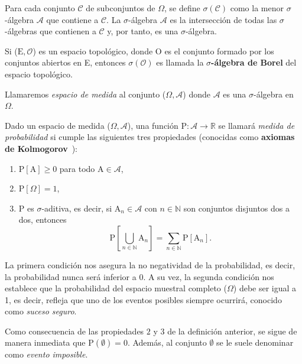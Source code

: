 \begin{definicion}\label{def:sigma-algebra-borel}
    Para cada conjunto $\mathcal{C}$ de subconjuntos de $\Omega$, se define $\sigma(\mathcal{C})$ como la menor $\sigma$-álgebra $\mathcal{A}$ que contiene a $\mathcal{C}$. La $\sigma$-álgebra $\mathcal{A}$ es la intersección de todas las $\sigma$-álgebras que contienen a $\mathcal{C}$ y, por tanto, es una $\sigma$-álgebra.

    Si ($\mathrm{E}, \mathcal{O}$) es un espacio topológico, donde $\mathrm{O}$ es el conjunto formado por los conjuntos abiertos en E, entonces $\sigma(\mathcal{O})$ es llamada la \textbf{$\sigma$-álgebra de Borel} del espacio topológico.
\end{definicion}

Llamaremos \emph{espacio de medida} al conjunto ($\Omega, \mathcal{A}$) donde $\mathcal{A}$ es una $\sigma$-álgebra en $\Omega$.

\begin{definicion}\label{def:medida-de-probabilidad}
    Dado un espacio de medida ($\Omega, \mathcal{A}$), una función $\mathrm{P}: \mathcal{A} \to \mathbb{R}$ se llamará \emph{medida de probabilidad} si cumple las siguientes tres propiedades (conocidas como \textbf{axiomas de Kolmogorov}~\cite{Kolmogorov1956}):

    \begin{enumerate}
        \item $\mathrm{P}[\mathrm{A}] \ge 0$ para todo $\mathrm{A} \in \mathcal{A}$,
        \item $\mathrm{P}[\Omega]=1$,
        \item $\mathrm{P}$ es $\sigma$-aditiva, es decir, si $\mathrm{A}_n \in \mathcal{A}$ con $n \in \mathbb{N}$ son conjuntos disjuntos dos a dos, entonces 
        \[ \mathrm{P}\left[\bigcup_{n \in \mathbb{N}} \mathrm{A}_{n}\right] = \sum\limits_{n \in \mathbb{N}} \mathrm{P}[\mathrm{A}_n]. \]
    \end{enumerate}
\end{definicion}

La primera condición nos asegura la no negatividad de la probabilidad, es decir, la probabilidad nunca será inferior a $0$. A su vez, la segunda condición nos establece que la probabilidad del espacio muestral completo ($\Omega$) debe ser igual a 1, es decir, refleja que uno de los eventos posibles siempre ocurrirá, conocido como \emph{suceso seguro}.

\begin{observacion}
Como consecuencia de las propiedades $2$ y $3$ de la definición anterior, se sigue de manera inmediata que $\mathrm{P}(\emptyset) = 0$. Además, al conjunto $\emptyset$ se le suele denominar como \emph{evento imposible}.
\end{observacion}

